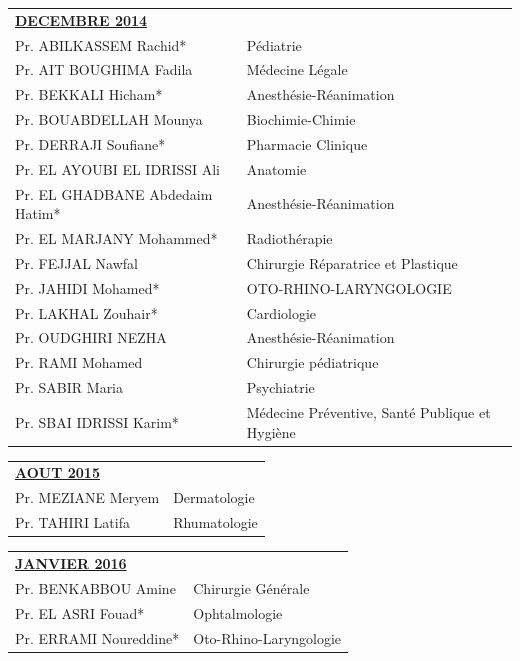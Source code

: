 \begin{table}[H]
  \begin{tabular}{l l}
    \multicolumn{2}{l}{\textbf{\underline{DECEMBRE 2014}}}\vspace*{0.5em}\\
    Pr. ABILKASSEM Rachid* & Pédiatrie \\
    Pr. AIT BOUGHIMA Fadila & Médecine Légale \\
    Pr. BEKKALI Hicham* & Anesthésie-Réanimation \\
    Pr. BOUABDELLAH Mounya & Biochimie-Chimie \\
    Pr. DERRAJI Soufiane* & Pharmacie Clinique \\
    Pr. EL AYOUBI EL IDRISSI Ali & Anatomie \\
    Pr. EL GHADBANE Abdedaim Hatim* & Anesthésie-Réanimation \\
    Pr. EL MARJANY Mohammed* & Radiothérapie \\
    Pr. FEJJAL Nawfal & Chirurgie Réparatrice et Plastique \\
    Pr. JAHIDI Mohamed* & OTO-RHINO-LARYNGOLOGIE \\
    Pr. LAKHAL Zouhair* & Cardiologie \\
    Pr. OUDGHIRI NEZHA & Anesthésie-Réanimation \\
    Pr. RAMI Mohamed & Chirurgie pédiatrique \\
    Pr. SABIR Maria & Psychiatrie \\
    Pr. SBAI IDRISSI Karim* & Médecine Préventive, Santé Publique et Hygiène \\
  \end{tabular}
\end{table}


\begin{table}[H]
  \begin{tabular}{l l}
    \multicolumn{2}{l}{\textbf{\underline{AOUT 2015}}}\vspace*{0.5em}\\
    Pr. MEZIANE Meryem & Dermatologie \\
    Pr. TAHIRI Latifa & Rhumatologie \\
  \end{tabular}
\end{table}


\begin{table}[H]
  \begin{tabular}{l l}
    \multicolumn{2}{l}{\textbf{\underline{JANVIER 2016}}}\vspace*{0.5em}\\
    Pr. BENKABBOU Amine & Chirurgie Générale \\
    Pr. EL ASRI Fouad* & Ophtalmologie \\
    Pr. ERRAMI Noureddine* & Oto-Rhino-Laryngologie \\
  \end{tabular}
\end{table}

